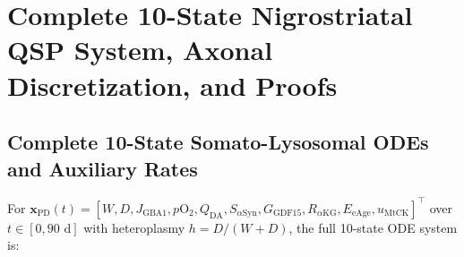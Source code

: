 \documentclass[11pt]{article}
\theoremstyle{plain}
\begin{document}
\appendix
\section{Complete 10-State Nigrostriatal QSP System, Axonal Discretization, and Proofs}
\label{app:pd_math}
\setcounter{equation}{0}

\subsection{Complete 10-State Somato-Lysosomal ODEs and Auxiliary Rates}
For $\mathbf{x}_{\mathrm{PD}}(t) = [W,\allowbreak D,\allowbreak J_{\mathrm{GBA1}},\allowbreak p\mathrm{O}_2,\allowbreak Q_{\mathrm{DA}},\allowbreak S_{\alpha\mathrm{Syn}},\allowbreak G_{\mathrm{GDF15}},\allowbreak R_{\alpha\mathrm{KG}},\allowbreak E_{\mathrm{eAge}},\allowbreak u_{\mathrm{MtCK}}]^\top$ over $t \in [0, 90\text{ d}]$ with heteroplasmy $h = D / (W + D)$, the full 10-state ODE system is:
\end{document}
